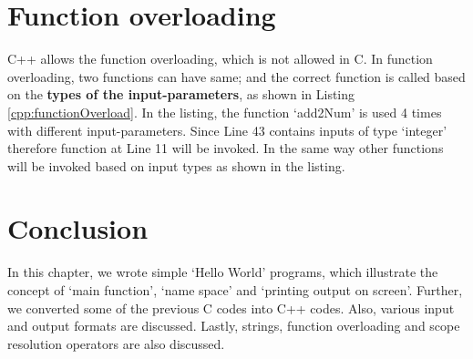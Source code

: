 

\section{Function overloading}
C++ allows the function overloading, which is not allowed in C. In function overloading, two functions can have same; and the correct function is called based on the \textbf{types of the input-parameters}, as shown in Listing \ref{cpp:functionOverload}. In the listing, the function `add2Num' is used 4 times with different input-parameters. Since Line 43 contains inputs of type `integer' therefore function at Line 11 will be invoked. In the same way other functions will be invoked based on input types as shown in the listing. 
 


\section{Conclusion}
In this chapter, we wrote simple `Hello World' programs, which illustrate the concept of `main function', `name space' and `printing output on screen'. Further, we converted some of the previous C codes into C++ codes. Also, various input and output formats are discussed. Lastly, strings, function overloading and scope resolution operators are also discussed. 
